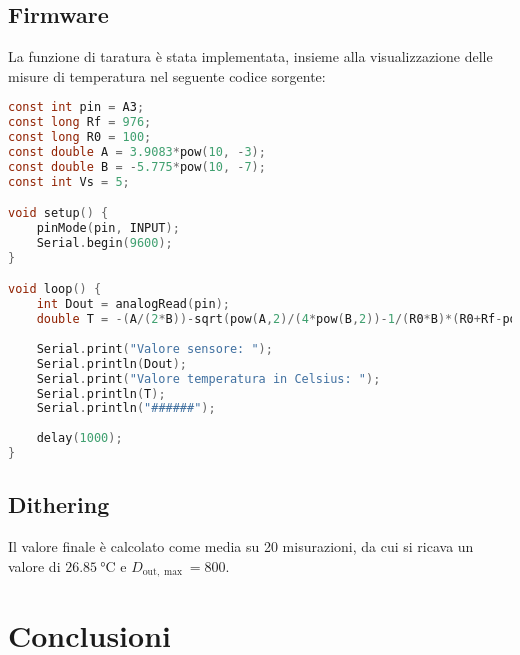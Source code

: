 \documentclass{article}
\begin{document}
\subsection{Firmware}
La funzione di taratura è stata implementata, insieme alla visualizzazione delle misure di temperatura nel seguente codice sorgente:
\begin{lstlisting}[language=C]
const int pin = A3;
const long Rf = 976;
const long R0 = 100;
const double A = 3.9083*pow(10, -3);
const double B = -5.775*pow(10, -7);
const int Vs = 5;

void setup() {
    pinMode(pin, INPUT);
    Serial.begin(9600);
}

void loop() {
    int Dout = analogRead(pin); 
    double T = -(A/(2*B))-sqrt(pow(A,2)/(4*pow(B,2))-1/(R0*B)*(R0+Rf-pow(2, 10)/Dout*Rf));
    
    Serial.print("Valore sensore: ");
    Serial.println(Dout);
    Serial.print("Valore temperatura in Celsius: ");
    Serial.println(T);  
    Serial.println("######");
    
    delay(1000);
}
\end{lstlisting}
\subsection{Dithering}
Il valore finale è calcolato come media su 20 misurazioni, da cui si ricava un valore di $\SI{26.85}{\celsius}$ e $D_{\text{out}, \max}=800$.
\section{Conclusioni}
\end{document}

